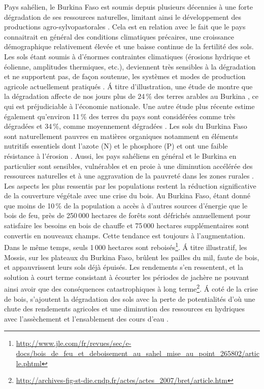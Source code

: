 \documentclass[a4paper,11pt]{article}
\begin{document}
Pays sahélien, le Burkina Faso est soumis depuis plusieurs décennies à
une forte dégradation de ses ressources naturelles, limitant ainsi le
développement des productions agro-sylvopastorales
\cite{Thiombiano_2000}. Cela est en relation avec le fait que le pays
connaitrait en général des conditions climatiques précaires, une
croissance démographique relativement élevée et une baisse continue de
la fertilité des sols. Les sols étant soumis à d'énormes contraintes
climatiques (érosions hydrique et éolienne, amplitudes thermiques,
etc.), deviennent très sensibles à la dégradation et ne supportent
pas, de façon soutenue, les systèmes et modes de production agricole
actuellement pratiqués \cite{PANA_2003}. \'{A} titre d'illustration,
une étude de \citeauthor{INERA_2003} montre que la dégradation affecte
de nos jours plus de 24\,\% des terres arables au Burkina
\cite{INERA_2003}, ce qui est préjudiciable à l'économie
nationale. Une autre étude plus récente estime également qu'environ
11\,\% des terres du pays sont considérées comme très dégradées et
34\,\%, comme moyennement dégradées \cite{SPCONEDD_2006}.  Les sols du
Burkina Faso sont naturellement pauvres en matières organiques
notamment en éléments nutritifs essentiels dont l'azote (N) et le
phosphore (P) \cite{Traore_2008} et ont une faible résistance à
l'érosion \cite{Berger_1991}. Aussi, les pays sahéliens en général et
le Burkina en particulier sont sensibles, vulnérables et en proie à
une diminution accélérée des ressources naturelles et à une
aggravation de la pauvreté dans les zones rurales
\cite{Roose_2004}. Les aspects les plus ressentis par les populations
restent la réduction significative de la couverture végétale avec une
crise du bois. Au Burkina Faso, étant donné que moins de 10\,\% de la
population a accès à d'autres sources d'énergie que le bois de feu,
près de 250\,000 hectares de forêts sont défrichés annuellement pour
satisfaire les besoins en bois de chauffe et 75\,000 hectares
supplémentaires sont convertis en nouveaux champs. Cette tendance est
toujours à l'augmentation. Dans le même temps, seuls 1\,000 hectares
sont
reboisés\footnote{\url{http://www.jle.com/fr/revues/sec/e-docs/bois_de_feu_et_deboisement_au_sahel_mise_au_point_265802/article.phtml}}. \'{A}
titre illustratif, les Mossis, sur les plateaux du Burkina Faso,
brûlent les pailles du mil, faute de bois, et appauvrissent leurs sols
déjà épuisés. Les rendements s'en ressentent, et la solution à court
terme consistant à écourter les périodes de jachère ne pouvant ainsi
avoir que des conséquences catastrophiques à long
terme\footnote{\url{http://archives-fig-st-die.cndp.fr/actes/actes_2007/bret/article.htm}}.
\'{A} coté de la crise de bois, s'ajoutent la dégradation des sols
avec la perte de potentialités d'où une chute des rendements agricoles
et une diminution des ressources en hydriques avec l'assèchement et
l'ensablement des cours d'eau \cite{ZOMBRE_2006}.
\end{document}
